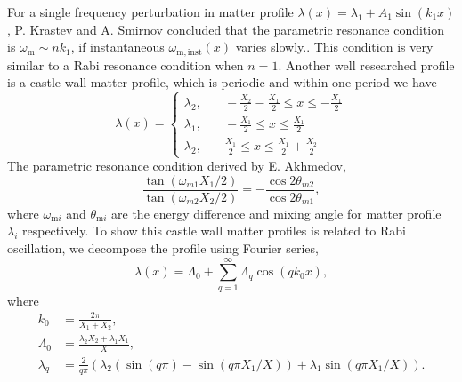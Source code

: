 \documentclass[%
preprint,
 amsmath,amssymb,
 aps,
]{revtex4-1}
\begin{document}

For a single frequency perturbation in matter profile $\lambda(x) =\lambda_1 +  A_1\sin(k_1 x)$, P. Krastev and A. Smirnov concluded that the parametric resonance condition is $\omega_{\mathrm{m}} \sim n k_1$, if instantaneous $\omega_{\mathrm{m,inst}}(x)$ varies slowly.\cite{Krastev1989}. This condition is very similar to a Rabi resonance condition when $n=1$. Another well researched profile is a castle wall matter profile, which is periodic and within one period we have
\begin{equation}
    \lambda(x) = \begin{cases} \lambda_2 , &\quad -\frac{X_2}{2}-\frac{X_1}{2}\le x \le -\frac{X_1}{2} \\
\lambda_1, &\quad -\frac{X_1}{2}\le x\le \frac{X_1}{2} \\
\lambda_2, &\quad \frac{X_1}{2}\le x\le \frac{X_1}{2}+\frac{X_2}{2}
\end{cases}
\end{equation}
The parametric resonance condition derived by E. Akhmedov\cite{Akhmedov2000},
\begin{equation}
    \frac{\tan (\omega_{m1}X_1/2)}{\tan (\omega_{m2}X_2/2)} = - \frac{\cos 2\theta_{m2}}{\cos 2\theta_{m1}},
\end{equation}
where $\omega_{\mathrm{m}i}$ and $\theta_{\mathrm{m}i}$ are the energy difference and mixing angle for matter profile $\lambda_i$ respectively. To show this castle wall matter profiles is related to Rabi oscillation, we decompose the profile using Fourier series,
\begin{equation}
\lambda(x) = \Lambda_0 + \sum_{q=1}^{\infty} \Lambda_q \cos\left( q k_0  x \right),
\end{equation}
where 
\begin{align*}
k_0 &= \frac{2\pi}{X_1+X_2}, \\
\Lambda_0 &= \frac{\lambda_2 X_2 + \lambda_1 X_1}{X}, \\
\lambda_q & = \frac{2}{q\pi} \left( \lambda_2\left( \sin(q \pi ) - \sin(q \pi X_1/X) \right) + \lambda_1 \sin( q\pi X_1/X)  \right).
\end{align*}
\end{document}
